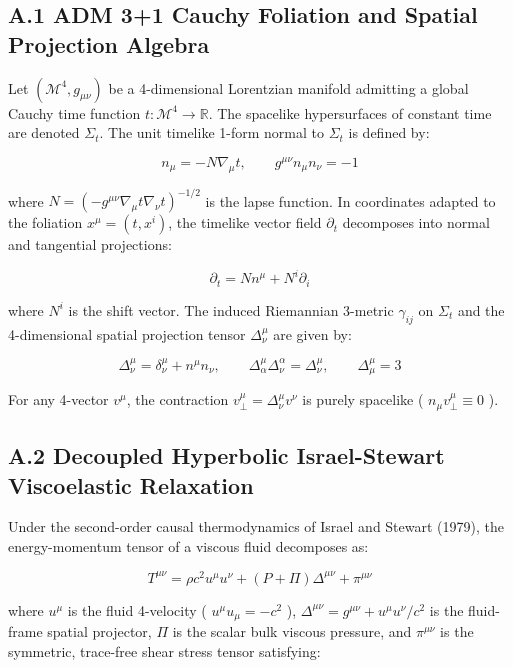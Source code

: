 \documentclass[11pt,a4paper]{article}
\theoremstyle{definition}\newtheorem{definition}{Definition}
\theoremstyle{remark}\newtheorem{remark}{Remark}
\begin{document}
\subsection{A.1 ADM 3+1 Cauchy Foliation and Spatial Projection Algebra}

Let $(\mathcal{M}^4, g_{\mu\nu})$ be a 4-dimensional Lorentzian manifold admitting a global Cauchy time function $t: \mathcal{M}^4 \to \mathbb{R}$. The spacelike hypersurfaces of constant time are denoted $\Sigma_t$. The unit timelike 1-form normal to $\Sigma_t$ is defined by:


\begin{equation}
n_\mu = -N \nabla_\mu t, \qquad g^{\mu\nu} n_\mu n_\nu = -1
\end{equation}


where $N = (-g^{\mu\nu}\nabla_\mu t \nabla_\nu t)^{-1/2}$ is the lapse function. In coordinates adapted to the foliation $x^\mu = (t, x^i)$, the timelike vector field $\partial_t$ decomposes into normal and tangential projections:


\begin{equation}
\partial_t = N n^\mu + N^i \partial_i
\end{equation}


where $N^i$ is the shift vector. The induced Riemannian 3-metric $\gamma_{ij}$ on $\Sigma_t$ and the 4-dimensional spatial projection tensor $\Delta^\mu_\nu$ are given by:


\begin{equation}
\Delta^\mu_\nu = \delta^\mu_\nu + n^\mu n_\nu, \qquad \Delta^\mu_\alpha \Delta^\alpha_\nu = \Delta^\mu_\nu, \qquad \Delta^\mu_\mu = 3
\end{equation}


For any 4-vector $v^\mu$, the contraction $v_\perp^\mu = \Delta^\mu_\nu v^\nu$ is purely spacelike ( $n_\mu v_\perp^\mu \equiv 0$ ).
\subsection{A.2 Decoupled Hyperbolic Israel-Stewart Viscoelastic Relaxation}

Under the second-order causal thermodynamics of Israel and Stewart (1979), the energy-momentum tensor of a viscous fluid decomposes as:


\begin{equation}
T^{\mu\nu} = \rho c^2 u^\mu u^\nu + (P + \Pi) \Delta^{\mu\nu} + \pi^{\mu\nu}
\end{equation}


where $u^\mu$ is the fluid 4-velocity ( $u^\mu u_\mu = -c^2$ ), $\Delta^{\mu\nu} = g^{\mu\nu} + u^\mu u^\nu / c^2$ is the fluid-frame spatial projector, $\Pi$ is the scalar bulk viscous pressure, and $\pi^{\mu\nu}$ is the symmetric, trace-free shear stress tensor satisfying:
\end{document}
